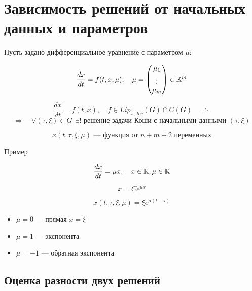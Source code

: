 \newpage

\section{Зависимость решений от начальных данных и параметров}

Пусть задано дифференциальное уравнение с параметром $\mu$:

$$\frac{dx}{dt} = f(t, x, \mu), \quad \mu = \begin{pmatrix}
  \mu_1 \\
  \vdots \\
  \mu_m
\end{pmatrix} \in \mathbb{R}^m$$

$$\frac{dx}{dt} = f(t, x), \quad f\in Lip_{x,\ loc}(G) \cap C(G) \quad \Rightarrow$$
$$\Rightarrow \quad \forall (\tau, \xi) \in G\ \ \exists!
\text{ решение задачи Коши с начальными данными } (\tau, \xi)$$

$$x(t, \tau, \xi, \mu) \text{ --- функция от $n+m+2$ переменных}$$


\begin{wrapfigure}{r}{0.5\textwidth}
\end{wrapfigure}

Пример

$$\frac{dx}{dt} = \mu x, \quad x \in \mathbb{R}, \mu \in \mathbb{R}$$

$$x = Ce^{\mu x}$$

$$x(t, \tau, \xi, \mu) = \xi e^{\mu (t - \tau)}$$

\begin{itemize}
  \item $\mu = 0$ --- прямая $x = \xi$
  \item $\mu = 1$ --- экспонента
  \item $\mu = -1$ --- обратная экспонента
\end{itemize}


\vspace{10mm}
\subsection{Оценка разности двух решений}


